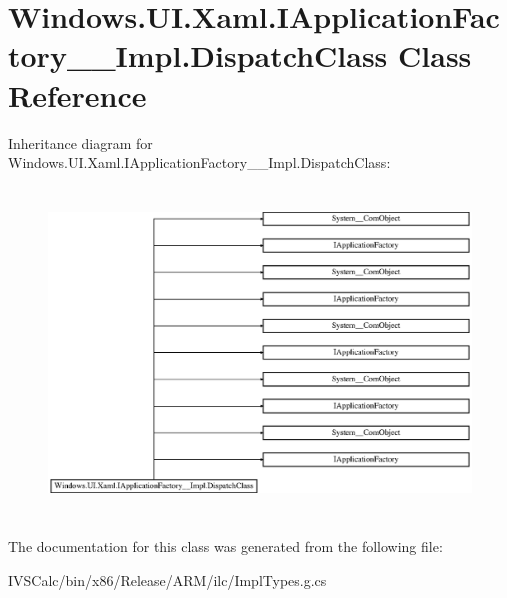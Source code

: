 \hypertarget{class_windows_1_1_u_i_1_1_xaml_1_1_i_application_factory_____impl_1_1_dispatch_class}{}\section{Windows.\+U\+I.\+Xaml.\+I\+Application\+Factory\+\_\+\+\_\+\+Impl.\+Dispatch\+Class Class Reference}
\label{class_windows_1_1_u_i_1_1_xaml_1_1_i_application_factory_____impl_1_1_dispatch_class}
Inheritance diagram for Windows.\+U\+I.\+Xaml.\+I\+Application\+Factory\+\_\+\+\_\+\+Impl.\+Dispatch\+Class\+:\begin{figure}[H]
\begin{center}
\leavevmode
\includegraphics[height=8.774929cm]{class_windows_1_1_u_i_1_1_xaml_1_1_i_application_factory_____impl_1_1_dispatch_class}
\end{center}
\end{figure}


The documentation for this class was generated from the following file\+:\begin{DoxyCompactItemize}
\item 
I\+V\+S\+Calc/bin/x86/\+Release/\+A\+R\+M/ilc/Impl\+Types.\+g.\+cs\end{DoxyCompactItemize}
